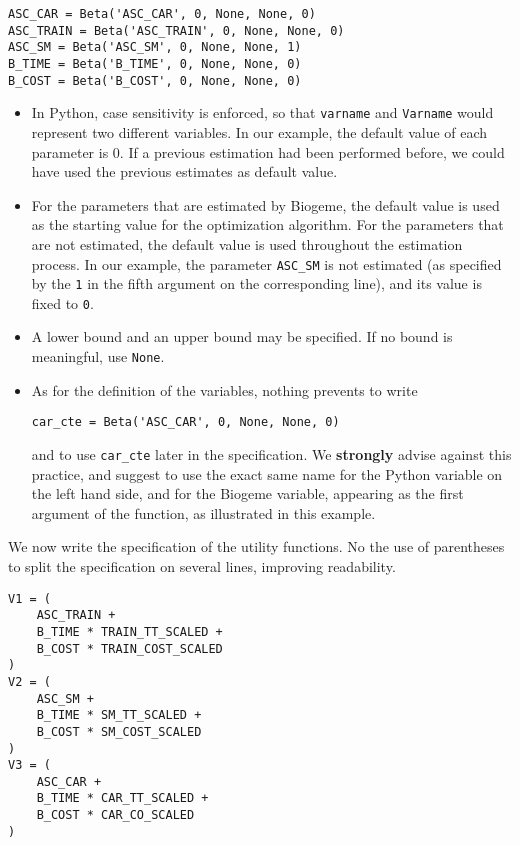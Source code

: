\documentclass[12pt,a4paper]{article}
\begin{document}
\begin{lstlisting}[style=nonumbers]
ASC_CAR = Beta('ASC_CAR', 0, None, None, 0)
ASC_TRAIN = Beta('ASC_TRAIN', 0, None, None, 0)
ASC_SM = Beta('ASC_SM', 0, None, None, 1)
B_TIME = Beta('B_TIME', 0, None, None, 0)
B_COST = Beta('B_COST', 0, None, None, 0)
\end{lstlisting}

\begin{itemize}
\item  In Python, case sensitivity is enforced, so that
\verb+varname+ and \verb+Varname+ would represent two different
variables.  In our example, the default value of each parameter is
0. If a previous estimation had been performed before, we could have
used the previous estimates as default value.
\item For the
parameters that are estimated by Biogeme, the default value is used
as the starting value for the optimization algorithm. For the
parameters that are not estimated, the default value is used
throughout the estimation process. In our example, the parameter
\lstinline$ASC_SM$ is not estimated (as specified by the \lstinline$1$
in the fifth argument on the corresponding line), and its value is
fixed to \lstinline$0$.
\item 
A lower bound and an upper bound may be
specified. If no bound is meaningful,  use \lstinline$None$.
\item As for the definition of the variables, nothing prevents to write
\begin{lstlisting}[style=nonumbers]
car_cte = Beta('ASC_CAR', 0, None, None, 0)
\end{lstlisting}
and to use \lstinline+car_cte+ later in the specification.   We
\textbf{strongly} advise against this practice, and suggest to use the
exact same name for the Python variable on the left hand side, and for
the Biogeme variable, appearing as the first argument of the
function, as illustrated in this example. 
\end{itemize}


We now write the specification of the
utility functions. No the use of parentheses to split the specification on several lines, improving readability. 

\begin{lstlisting}[style=nonumbers]
V1 = (
    ASC_TRAIN +
    B_TIME * TRAIN_TT_SCALED +
    B_COST * TRAIN_COST_SCALED
)
V2 = (
    ASC_SM +
    B_TIME * SM_TT_SCALED +
    B_COST * SM_COST_SCALED
)
V3 = (
    ASC_CAR +
    B_TIME * CAR_TT_SCALED +
    B_COST * CAR_CO_SCALED
)
\end{lstlisting}
\end{document}
